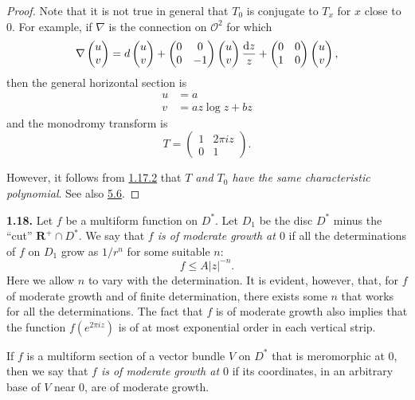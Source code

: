 \documentclass{report}
\newenvironment{rmenv}[1]
  {\phantomsection\par\medskip\noindent\textbf{#1.}\rmfamily}
  {\medskip}
\renewcommand{\cal}[1]{{\mathcal{#1}}}
\newcommand{\dd}{\mathrm{d}}
\newcommand{\RR}{\mathbf{R}}
\renewcommand{\leq}{\leqslant}
\newcommand{\oldpage}[1]{\marginpar{\footnotesize$\Big\vert$ \textit{p.~#1}}}
\begin{document}
\begin{proof}
  Note that it is not true in general that $T_0$ is conjugate to $T_x$ for $x$ close to $0$.
  For example, if $\nabla$ is the connection on $\cal{O}^2$ for which
  \[
    \nabla\begin{pmatrix}u\\v\end{pmatrix}
    = \\d\begin{pmatrix}u\\v\end{pmatrix} + \begin{pmatrix}0&0\\0&-1\end{pmatrix}\begin{pmatrix}u\\v\end{pmatrix}\frac{\dd z}{z} + \begin{pmatrix}0&0\\1&0\end{pmatrix}\begin{pmatrix}u\\v\end{pmatrix},
  \]
  then the general horizontal section is
\oldpage{55}
  \[
    \begin{aligned}
      u &= a
    \\v &= az\log z+bz
    \end{aligned}
  \]
  and the monodromy transform is
  \[
    T = \begin{pmatrix}1&2\pi iz\\0&1\end{pmatrix}.
  \]

  However, it follows from \hyperref[II.1.17.2]{1.17.2} that \emph{$T$ and $T_0$ have the same characteristic polynomial}.
  See also \hyperref[II.5.6]{5.6}.
\end{proof}

\begin{rmenv}{1.18}
\label{II.1.18}
  Let $f$ be a multiform function on $D^*$.
  Let $D_1$ be the disc $D^*$ minus the ``cut'' $\RR^+\cap D^*$.
  We say that \emph{$f$ is of moderate growth at $0$} if all the determinations of $f$ on $D_1$ grow as $1/r^n$ for some suitable $n$:
  \[
    f \leq A|z|^{-n}.
  \]
  Here we allow $n$ to vary with the determination.
  It is evident, however, that, for $f$ of moderate growth and of finite determination, there exists some $n$ that works for all the determinations.
  The fact that $f$ is of moderate growth also implies that the function $f(e^{2\pi iz})$ is of at most exponential order in each vertical strip.

  If $f$ is a multiform section of a vector bundle $V$ on $D^*$ that is meromorphic at $0$, then we say that \emph{$f$ is of moderate growth at $0$} if its coordinates, in an arbitrary base of $V$ near $0$, are of moderate growth.
\end{rmenv}
\end{document}
